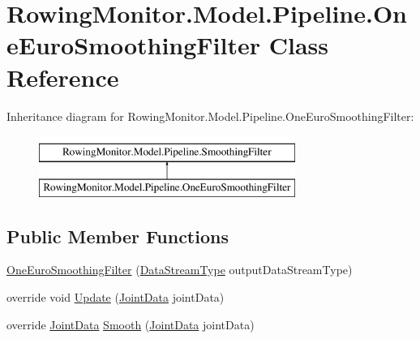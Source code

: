 \hypertarget{class_rowing_monitor_1_1_model_1_1_pipeline_1_1_one_euro_smoothing_filter}{}\section{Rowing\+Monitor.\+Model.\+Pipeline.\+One\+Euro\+Smoothing\+Filter Class Reference}
\label{class_rowing_monitor_1_1_model_1_1_pipeline_1_1_one_euro_smoothing_filter}
Inheritance diagram for Rowing\+Monitor.\+Model.\+Pipeline.\+One\+Euro\+Smoothing\+Filter\+:\begin{figure}[H]
\begin{center}
\leavevmode
\includegraphics[height=2.000000cm]{class_rowing_monitor_1_1_model_1_1_pipeline_1_1_one_euro_smoothing_filter}
\end{center}
\end{figure}
\subsection*{Public Member Functions}
\begin{DoxyCompactItemize}
\item 
\hyperlink{class_rowing_monitor_1_1_model_1_1_pipeline_1_1_one_euro_smoothing_filter_a40e995e638198ea34d3c233663f6462c}{One\+Euro\+Smoothing\+Filter} (\hyperlink{namespace_rowing_monitor_1_1_model_1_1_util_a01e1a06061533b246feb7421c9d0107f}{Data\+Stream\+Type} output\+Data\+Stream\+Type)
\item 
override void \hyperlink{class_rowing_monitor_1_1_model_1_1_pipeline_1_1_one_euro_smoothing_filter_a2e518ce98440b3004aaf1af9a4eba399}{Update} (\hyperlink{struct_rowing_monitor_1_1_model_1_1_util_1_1_joint_data}{Joint\+Data} joint\+Data)
\item 
override \hyperlink{struct_rowing_monitor_1_1_model_1_1_util_1_1_joint_data}{Joint\+Data} \hyperlink{class_rowing_monitor_1_1_model_1_1_pipeline_1_1_one_euro_smoothing_filter_afd860237def583deb4499bc3c9fac868}{Smooth} (\hyperlink{struct_rowing_monitor_1_1_model_1_1_util_1_1_joint_data}{Joint\+Data} joint\+Data)
\end{DoxyCompactItemize}
